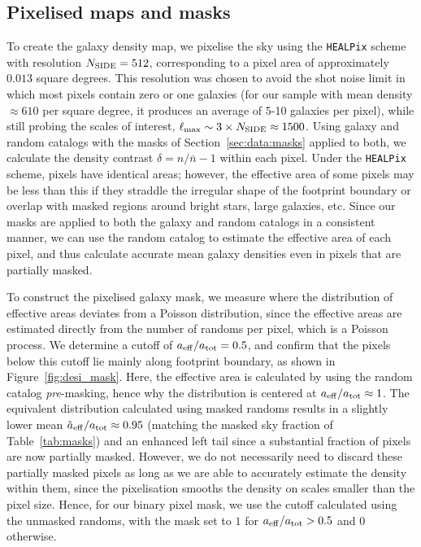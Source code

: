 \documentclass[a4paper,usenatbib]{mnras}
\begin{document}
\subsection{Pixelised maps and masks}

To create the galaxy density map, we pixelise the sky using the \texttt{HEALPix} scheme with resolution $N_{\rm SIDE} = 512$, corresponding to a pixel area of approximately $0.013$ square degrees. This resolution was chosen to avoid the shot noise limit in which most pixels contain zero or one galaxies (for our sample with mean density $\approx 610$ per square degree, it produces an average of 5-10 galaxies per pixel), while still probing the scales of interest, $\ell_{\rm max} \sim 3 \times N_{\rm SIDE} \approx 1500$. Using galaxy and random catalogs with the masks of Section~\ref{sec:data:masks} applied to both, we calculate the density contrast $\delta = n/\bar{n} - 1$ within each pixel. Under the \texttt{HEALPix} scheme, pixels have identical areas; however, the effective area of some pixels may be less than this if they straddle the irregular shape of the footprint boundary or overlap with masked regions around bright stars, large galaxies, etc. Since our masks are applied to both the galaxy and random catalogs in a consistent manner, we can use the random catalog to estimate the effective area of each pixel, and thus calculate accurate mean galaxy densities even in pixels that are partially masked.

To construct the pixelised galaxy mask, we measure where the distribution of effective areas deviates from a Poisson distribution, since the effective areas are estimated directly from the number of randoms per pixel, which is a Poisson process. We determine a cutoff of $a_{\rm eff}/a_{\rm tot} = 0.5$, and confirm that the pixels below this cutoff lie mainly along footprint boundary, as shown in Figure~\ref{fig:desi_mask}. Here, the effective area is calculated by using the random catalog \textit{pre}-masking, hence why the distribution is centered at $a_{\rm eff}/a_{\rm tot} \approx 1$. The equivalent distribution calculated using masked randoms results in a slightly lower mean $\tilde{a}_{\rm eff}/a_{\rm tot} \approx 0.95$ (matching the masked sky fraction of Table~\ref{tab:masks}) and an enhanced left tail since a substantial fraction of pixels are now partially masked. However, we do not necessarily need to discard these partially masked pixels as long as we are able to accurately estimate the density within them, since the pixelisation smooths the density on scales smaller than the pixel size. Hence, for our binary pixel mask, we use the cutoff calculated using the unmasked randoms, with the mask set to $1$ for $a_{\rm eff}/a_{\rm tot} > 0.5$ and 0 otherwise.
\end{document}
